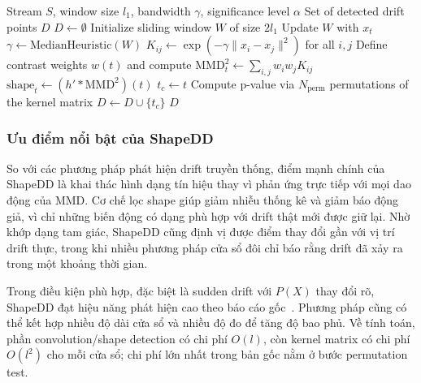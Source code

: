 \begin{algorithm}[H]
	\caption{Shape-based Drift Detector (ShapeDD)}
	\label{alg:shapedd_theory}
	\begin{algorithmic}[1]
		\Require Stream $S$, window size $l_1$, bandwidth $\gamma$, significance level $\alpha$
		\Ensure Set of detected drift points $D$
		\State $D \leftarrow \emptyset$
		\State Initialize sliding window $W$ of size $2l_1$
			\State Update $W$ with $x_t$
				\State $\gamma \leftarrow \text{MedianHeuristic}(W)$ 
				\State $K_{ij} \leftarrow \exp\!\left(-\gamma\|x_i - x_j\|^2\right)$ for all $i,j$ 
				\State Define contrast weights $w(t)$ and compute $\text{MMD}^2_t \leftarrow \sum_{i,j} w_i w_j K_{ij}$
				\State $\text{shape}_t \leftarrow (h' * \text{MMD}^2)(t)$ 
				 
					\State $t_c \leftarrow t$
					\State Compute p-value via $N_{\text{perm}}$ permutations of the kernel matrix
						\State $D \leftarrow D \cup \{t_c\}$ 
					\EndIf
				\EndIf
			\EndIf
		\EndFor
		\Return $D$
	\end{algorithmic}
\end{algorithm}

\subsubsection{Ưu điểm nổi bật của ShapeDD}

So với các phương pháp phát hiện drift truyền thống, điểm mạnh chính của ShapeDD là khai thác hình dạng tín hiệu thay vì phản ứng trực tiếp với mọi dao động của MMD. Cơ chế lọc shape giúp giảm nhiễu thống kê và giảm báo động giả, vì chỉ những biến động có dạng phù hợp với drift thật mới được giữ lại. Nhờ khớp dạng tam giác, ShapeDD cũng định vị được điểm thay đổi gần với vị trí drift thực, trong khi nhiều phương pháp cửa sổ đôi chỉ báo rằng drift đã xảy ra trong một khoảng thời gian.

Trong điều kiện phù hợp, đặc biệt là sudden drift với $P(X)$ thay đổi rõ, ShapeDD đạt hiệu năng phát hiện cao theo báo cáo gốc~\cite{shapeDD2021}. Phương pháp cũng có thể kết hợp nhiều độ dài cửa sổ và nhiều độ đo để tăng độ bao phủ. Về tính toán, phần convolution/shape detection có chi phí $O(l)$, còn kernel matrix có chi phí $O(l^2)$ cho mỗi cửa sổ; chi phí lớn nhất trong bản gốc nằm ở bước permutation test.

